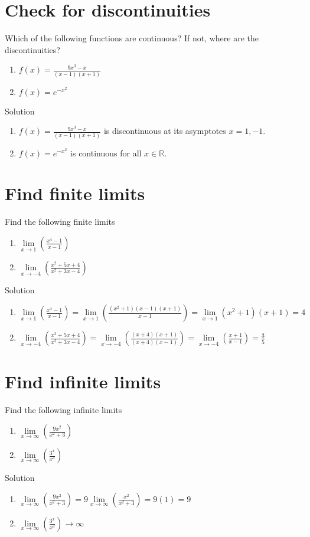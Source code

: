 \documentclass[12pt]{article}
\begin{document}
\section{Check for discontinuities}
Which of the following functions are continuous? If not, where are the discontinuities?

\begin{enumerate}
    \item $f(x) = \frac{9x^3 -x}{(x-1)(x+1)}$
    \item $f(x) = e^{-x^2}$
\end{enumerate}
Solution
\begin{enumerate}
    \item $f(x) = \frac{9x^3 -x}{(x-1)(x+1)} $ is discontinuous at its asymptotes $x=1,-1$. 
    \item $f(x) = e^{-x^2}$ is continuous for all $x \in \mathbb{R}$.
\end{enumerate}

\section{Find finite limits }
Find the following finite limits
\begin{enumerate}
    \item $\lim\limits_{x \to 1} \left( \frac{x^4-1}{x-1}\right)$
    \item $\lim\limits_{x \to -4} \left( \frac{x^2 +5x + 4}{x^2 + 3x - 4} \right)$
\end{enumerate}
Solution

\begin{enumerate}
    \item $\lim\limits_{x \to 1} \left( \frac{x^4-1}{x-1}\right) = \lim\limits_{x \to 1} \left( \frac{(x^2+1)(x-1)(x+1)}{x-1}\right)  = \lim\limits_{x \to 1}  (x^2+1)(x+1) =4 $
    \item $\lim\limits_{x \to -4} \left( \frac{x^2 +5x + 4}{x^2 + 3x - 4} \right) = \lim\limits_{x \to -4} \left( \frac{(x+4)(x+1)}{(x+4)(x-1)} \right)=   \lim\limits_{x \to -4} \left( \frac{x+1}{x-1} \right) = \frac{3}{5}$
\end{enumerate}

\section{Find infinite limits}
Find the following infinite limits
\begin{enumerate}
    \item $\lim\limits_{x \to \infty} \left(\frac{9x^2}{x^2+3}\right)$
    \item $\lim\limits_{x \to \infty} \left(\frac{3^x}{x^3}\right)$
\end{enumerate}
Solution
\begin{enumerate}
    \item $\lim\limits_{x \to \infty} \left(\frac{9x^2}{x^2+3}\right)=9\lim\limits_{x \to \infty} \left(\frac{x^2}{x^2+3}\right) = 9(1)=9$
    \item $\lim\limits_{x \to \infty} \left(\frac{3^x}{x^3}\right) \to \infty $
\end{enumerate}
\end{document}
